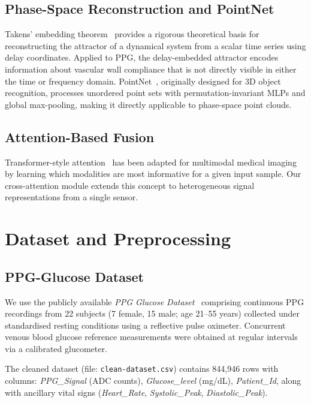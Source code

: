 \documentclass[conference]{IEEEtran}
\begin{document}
\subsection{Phase-Space Reconstruction and PointNet}
Takens' embedding theorem~\cite{takens1981} provides a rigorous theoretical
basis for reconstructing the attractor of a dynamical system from a scalar
time series using delay coordinates.  Applied to PPG, the delay-embedded
attractor encodes information about vascular wall compliance that is not
directly visible in either the time or frequency domain.
PointNet~\cite{qi2017pointnet}, originally designed for 3D object recognition,
processes unordered point sets with permutation-invariant MLPs and global
max-pooling, making it directly applicable to phase-space point clouds.

\subsection{Attention-Based Fusion}
Transformer-style attention~\cite{vaswani2017attention} has been adapted for
multimodal medical imaging by learning which modalities are most informative for
a given input sample.  Our cross-attention module extends this concept to
heterogeneous signal representations from a single sensor.

\section{Dataset and Preprocessing}
\label{sec:data}

\subsection{PPG-Glucose Dataset}
We use the publicly available \emph{PPG Glucose Dataset}~\cite{ppgdataset2023}
comprising continuous PPG recordings from 22 subjects (7 female, 15 male;
age 21--55 years) collected under standardised resting conditions using a
reflective pulse oximeter.  Concurrent venous blood glucose reference
measurements were obtained at regular intervals via a calibrated glucometer.

The cleaned dataset (file: \texttt{clean-dataset.csv}) contains 844,946 rows
with columns: \textit{PPG\_Signal} (ADC counts), \textit{Glucose\_level}
(mg/dL), \textit{Patient\_Id}, along with ancillary vital signs
(\textit{Heart\_Rate}, \textit{Systolic\_Peak}, \textit{Diastolic\_Peak}).
\end{document}
